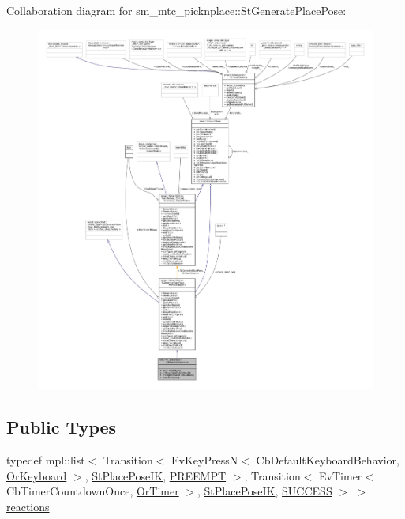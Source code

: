 Collaboration diagram for sm\+\_\+mtc\+\_\+picknplace\+:\+:St\+Generate\+Place\+Pose\+:
\nopagebreak
\begin{figure}[H]
\begin{center}
\leavevmode
\includegraphics[width=350pt]{structsm__mtc__picknplace_1_1StGeneratePlacePose__coll__graph}
\end{center}
\end{figure}
\subsection*{Public Types}
\begin{DoxyCompactItemize}
\item 
typedef mpl\+::list$<$ Transition$<$ Ev\+Key\+PressN$<$ Cb\+Default\+Keyboard\+Behavior, \hyperlink{classsm__mtc__picknplace_1_1OrKeyboard}{Or\+Keyboard} $>$, \hyperlink{structsm__mtc__picknplace_1_1StPlacePoseIK}{St\+Place\+Pose\+IK}, \hyperlink{classPREEMPT}{P\+R\+E\+E\+M\+PT} $>$, Transition$<$ Ev\+Timer$<$ Cb\+Timer\+Countdown\+Once, \hyperlink{classsm__mtc__picknplace_1_1OrTimer}{Or\+Timer} $>$, \hyperlink{structsm__mtc__picknplace_1_1StPlacePoseIK}{St\+Place\+Pose\+IK}, \hyperlink{classSUCCESS}{S\+U\+C\+C\+E\+SS} $>$ $>$ \hyperlink{structsm__mtc__picknplace_1_1StGeneratePlacePose_a549e3d54ce7c0104116c301ae25a23f2}{reactions}
\end{DoxyCompactItemize}
